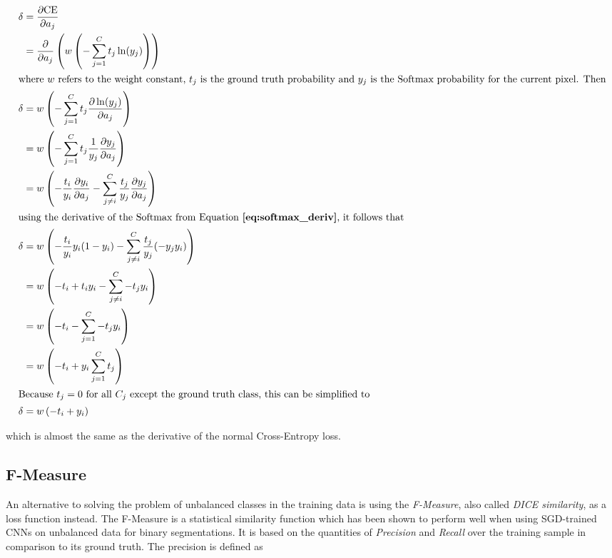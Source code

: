 \begin {align}
	\delta &= \frac{\partial \text{CE}}{\partial a_j} \\
		&= \frac{\partial}{\partial a_j} \left ( w \left ( - \sum \limits_{j=1}^{C} t_j \ln(y_j) \right ) \right ) \\ \intertext{where $w$ refers to the weight constant, $t_j$ is the ground truth probability and $y_j$ is the Softmax probability for the current pixel. Then}
		\delta &= w \left ( - \sum \limits_{j=1}^{C} t_j \frac{\partial \ln(y_j)}{\partial a_j} \right ) \\
		&= w \left (- \sum \limits_{j=1}^{C} t_j \frac{1}{y_j} \frac{\partial y_j}{\partial a_j} \right ) \\
		&= w \left ( - \frac{t_i}{y_i} \frac{\partial y_i}{\partial a_j} - \sum \limits_{j \neq i}^{C} \frac{t_j}{y_j} \frac{\partial y_j}{\partial a_j} \right ) \\ \intertext{using the derivative of the Softmax from Equation \textbf{\ref{eq:softmax_deriv}}, it follows that}
		\delta &= w \left ( - \frac{t_i}{y_i} y_i (1 - y_i) - \sum \limits_{j \neq i}^{C} \frac{t_j}{y_j} (- y_j y_i) \right ) \\
		&= w \left ( - t_i + t_i y_i - \sum \limits_{j \neq i}^{C} - t_j y_i \right ) \\
		&= w \left ( - t_i - \sum \limits_{j=1}^{C} - t_j y_i  \right ) \\
		&= w \left ( - t_i + y_i \sum \limits_{j=1}^{C} t_j \right ) \\ \intertext{Because $t_j = 0$ for all $C_j$ except the ground truth class, this can be simplified to} 
		\delta &= w \left (- t_i + y_i \right )
\end {align}

\noindent which is almost the same as the derivative of the normal Cross-Entropy loss.


		\subsection{F-Measure}
\label{subsec:fmeasure}

An alternative to solving the problem of unbalanced classes in the training data is using the \textit{F-Measure}, also called \textit{DICE similarity}, as a loss function instead. The F-Measure is a statistical similarity function which has been shown to perform well when using SGD-trained CNNs on unbalanced data for binary segmentations. \cite{fmeasure3, fmeasure5} It is based on the quantities of \textit{Precision} and \textit{Recall} over the training sample in comparison to its ground truth. The precision is defined as

